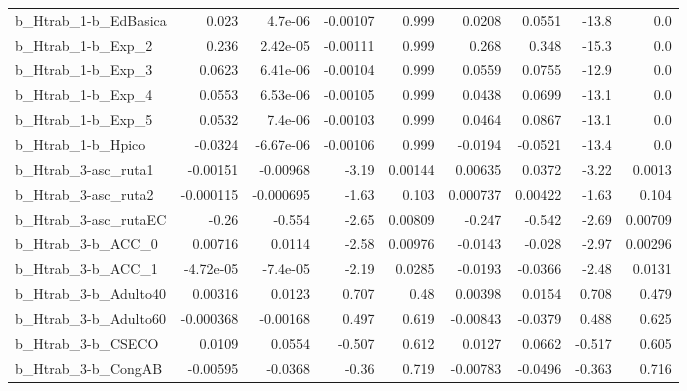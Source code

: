 \begin{tabular}{lrrrrrrrr}
b\_Htrab\_1-b\_EdBasica       &       0.023 &      4.7e-06 & -0.00107 &    0.999 &     0.0208 &      0.0551 &        -13.8 &           0.0 \\
b\_Htrab\_1-b\_Exp\_2          &       0.236 &     2.42e-05 & -0.00111 &    0.999 &      0.268 &       0.348 &        -15.3 &           0.0 \\
b\_Htrab\_1-b\_Exp\_3          &      0.0623 &     6.41e-06 & -0.00104 &    0.999 &     0.0559 &      0.0755 &        -12.9 &           0.0 \\
b\_Htrab\_1-b\_Exp\_4          &      0.0553 &     6.53e-06 & -0.00105 &    0.999 &     0.0438 &      0.0699 &        -13.1 &           0.0 \\
b\_Htrab\_1-b\_Exp\_5          &      0.0532 &      7.4e-06 & -0.00103 &    0.999 &     0.0464 &      0.0867 &        -13.1 &           0.0 \\
b\_Htrab\_1-b\_Hpico          &     -0.0324 &    -6.67e-06 & -0.00106 &    0.999 &    -0.0194 &     -0.0521 &        -13.4 &           0.0 \\
b\_Htrab\_3-asc\_ruta1        &    -0.00151 &     -0.00968 &    -3.19 &  0.00144 &    0.00635 &      0.0372 &        -3.22 &        0.0013 \\
b\_Htrab\_3-asc\_ruta2        &   -0.000115 &    -0.000695 &    -1.63 &    0.103 &   0.000737 &     0.00422 &        -1.63 &         0.104 \\
b\_Htrab\_3-asc\_rutaEC       &       -0.26 &       -0.554 &    -2.65 &  0.00809 &     -0.247 &      -0.542 &        -2.69 &       0.00709 \\
b\_Htrab\_3-b\_ACC\_0          &     0.00716 &       0.0114 &    -2.58 &  0.00976 &    -0.0143 &      -0.028 &        -2.97 &       0.00296 \\
b\_Htrab\_3-b\_ACC\_1          &   -4.72e-05 &     -7.4e-05 &    -2.19 &   0.0285 &    -0.0193 &     -0.0366 &        -2.48 &        0.0131 \\
b\_Htrab\_3-b\_Adulto40       &     0.00316 &       0.0123 &    0.707 &     0.48 &    0.00398 &      0.0154 &        0.708 &         0.479 \\
b\_Htrab\_3-b\_Adulto60       &   -0.000368 &     -0.00168 &    0.497 &    0.619 &   -0.00843 &     -0.0379 &        0.488 &         0.625 \\
b\_Htrab\_3-b\_CSECO          &      0.0109 &       0.0554 &   -0.507 &    0.612 &     0.0127 &      0.0662 &       -0.517 &         0.605 \\
b\_Htrab\_3-b\_CongAB         &    -0.00595 &      -0.0368 &    -0.36 &    0.719 &   -0.00783 &     -0.0496 &       -0.363 &         0.716 \\

\end{tabular}
